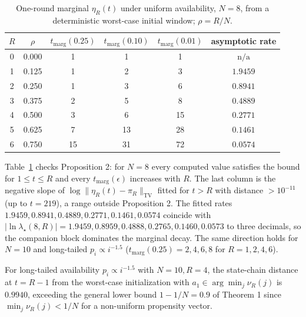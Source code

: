 \documentclass[twoside,11pt]{article}
\begin{document}
\begin{table}[!t]
\small
\centering
\begin{tabular}{@{}cccccc@{}}
\toprule
$R$ & $\rho$ & $t_{\mathrm{marg}}(0.25)$ & $t_{\mathrm{marg}}(0.10)$ & $t_{\mathrm{marg}}(0.01)$ & asymptotic rate \\
\midrule
0 & 0.000 & 1 & 1 & 1 & $\mathrm{n/a}$ \\
1 & 0.125 & 1 & 2 & 3 & $1.9459$ \\
2 & 0.250 & 1 & 3 & 6 & $0.8941$ \\
3 & 0.375 & 2 & 5 & 8 & $0.4889$ \\
4 & 0.500 & 3 & 6 & 15 & $0.2771$ \\
5 & 0.625 & 7 & 13 & 28 & $0.1461$ \\
6 & 0.750 & 15 & 31 & 72 & $0.0574$ \\
\bottomrule
\end{tabular}
\caption{One-round marginal $\eta_R(t)$ under uniform availability, $N=8$, from a deterministic worst-case initial window; $\rho=R/N$.}
\label{table:II}
\end{table}

Table~\ref{table:II} checks Proposition 2: for $N=8$ every computed
value satisfies the bound for $1\le t\le R$ and every
$t_{\mathrm{marg}}(\epsilon)$ increases with $R$. The last column is the negative slope of
$\log\|\eta_R(t)-\pi_R\|_{\mathrm{TV}}$ fitted for $t>R$ with distance
$>10^{-11}$ (up to $t=219$), a range outside Proposition 2. The fitted rates
$1.9459,0.8941,0.4889,0.2771,0.1461,0.0574$ coincide with
$|\ln\lambda_\star(8,R)|=1.9459,0.8959,0.4888,0.2765,0.1460,0.0573$ to
three decimals, so the companion block dominates the marginal decay. The
same direction holds for $N=10$ and long-tailed $p_i\propto i^{-1.5}$
($t_{\mathrm{marg}}(0.25)=2,4,6,8$ for $R=1,2,4,6$).

For long-tailed availability $p_i\propto i^{-1.5}$ with $N=10,R=4$, the state-chain distance at $t=R-1$ from the worst-case initialization with $a_1\in\arg\min_j\nu_R(j)$ is $0.9940$, exceeding the general lower bound $1-1/N=0.9$ of Theorem 1 since $\min_j\nu_R(j)<1/N$ for a non-uniform propensity vector.
\end{document}
